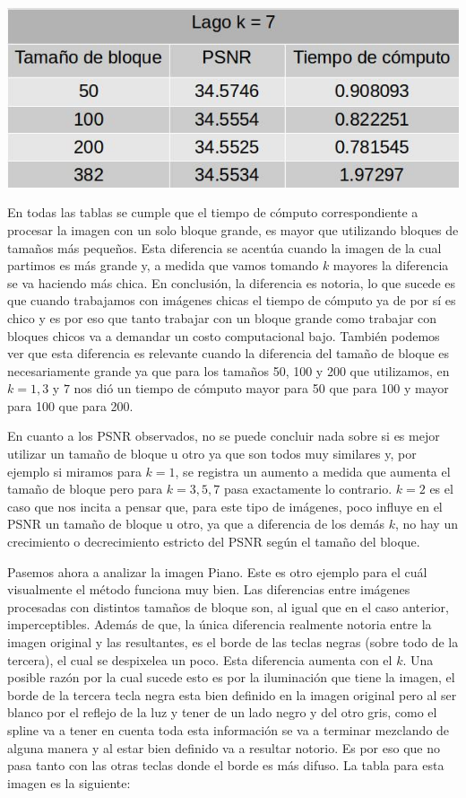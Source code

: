 \documentclass[a4paper]{article}
\begin{document}
\centerline{
\includegraphics[scale=0.5]{imagenes/lagok7Tabla.jpg}
}
En todas las tablas se cumple que el tiempo de cómputo correspondiente a procesar la imagen con un solo bloque grande, es mayor que utilizando bloques de tamaños más pequeños. Esta diferencia se acentúa cuando la imagen de la cual partimos es más grande y, a medida que vamos tomando $k$ mayores la diferencia se va haciendo más chica. En conclusión, la diferencia es notoria, lo que sucede es que cuando trabajamos con imágenes chicas el tiempo de cómputo ya de por sí es chico y es por eso que tanto trabajar con un bloque grande como trabajar con bloques chicos va a demandar un costo computacional bajo. También podemos ver que esta diferencia es relevante cuando la diferencia del tamaño de bloque es necesariamente grande ya que para los tamaños 50, 100 y 200 que utilizamos, en $k = 1, 3$ y $7$ nos dió un tiempo de cómputo mayor para 50 que para 100 y mayor para 100 que para 200.
\par En cuanto a los PSNR observados, no se puede concluir nada sobre si es mejor utilizar un tamaño de bloque u otro ya que son todos muy similares y, por ejemplo si miramos para $k = 1$, se registra un aumento a medida que aumenta el tamaño de bloque pero para $k = 3, 5, 7$ pasa exactamente lo contrario. $k = 2$ es el caso que nos incita a pensar que, para este tipo de imágenes, poco influye en el PSNR un tamaño de bloque u otro, ya que a diferencia de los demás $k$, no hay un crecimiento o decrecimiento estricto del PSNR según el tamaño del bloque.


Pasemos ahora a analizar la imagen Piano. Este es otro ejemplo para el cuál visualmente el método funciona muy bien. Las diferencias entre imágenes procesadas con distintos tamaños de bloque son, al igual que en el caso anterior, imperceptibles. Además de que, la única diferencia realmente notoria entre la imagen original y las resultantes, es el borde de las teclas negras (sobre todo de la tercera), el cual se despixelea un poco. Esta diferencia aumenta con el $k$. Una posible razón por la cual sucede esto es por la iluminación que tiene la imagen, el borde de la tercera tecla negra esta bien definido en la imagen original pero al ser blanco por el reflejo de la luz y tener de un lado negro y del otro gris, como el spline va a tener en cuenta toda esta información se va a terminar mezclando de alguna manera y al estar bien definido va a resultar notorio. Es por eso que no pasa tanto con las otras teclas donde el borde es más difuso. La tabla para esta imagen es la siguiente:
\newline
\end{document}

